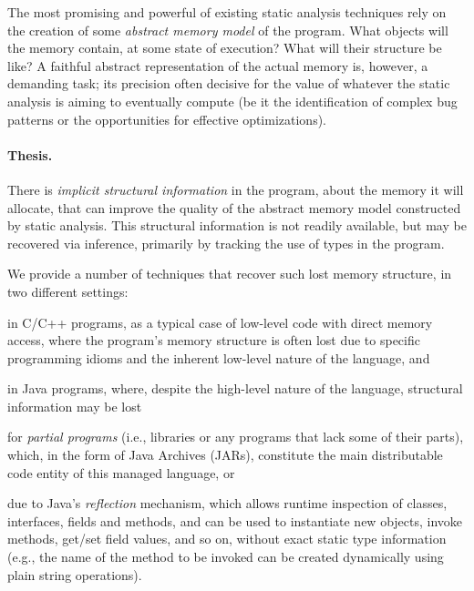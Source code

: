 The most promising and powerful of existing static analysis techniques
rely on the creation of some \emph{abstract memory model} of the
program. What objects will the memory contain, at some state of
execution? What will their structure be like?  A faithful abstract
representation of the actual memory is, however, a demanding task; its
precision often decisive for the value of whatever the static
analysis is aiming to eventually compute (be it the identification of
complex bug patterns or the opportunities for effective
optimizations).

\paragraph{Thesis.}
\begin{displayquote}
  There is \emph{implicit structural information} in the program,
  about the memory it will allocate, that can improve the quality of
  the abstract memory model constructed by static analysis. This
  structural information is not readily available, but may be
  recovered via inference, primarily by tracking the use of types in
  the program.
\end{displayquote}

We provide a number of techniques that recover such
lost memory structure, in two different settings:
\begin{inparaenum}[(1)]
\item in C/C++ programs, as a typical case of low-level code with
  direct memory access, where the program's memory structure is often
  lost due to specific programming idioms and the inherent low-level
  nature of the language, and
\item in Java programs, where, despite the high-level nature of the
  language, structural information may be lost
  \begin{inparaenum}[(a)]
  \item for \emph{partial programs} (i.e., libraries or any programs that
    lack some of their parts), which, in the form of Java Archives
    (JARs), constitute the main distributable code entity of this
    managed language, or
  \item due to Java's \emph{reflection} mechanism, which allows
    runtime inspection of classes, interfaces, fields and methods, and
    can be used to instantiate new objects, invoke methods, get/set
    field values, and so on, without exact static type information
    (e.g., the name of the method to be invoked can be created
    dynamically using plain string operations).
  \end{inparaenum}
\end{inparaenum}


